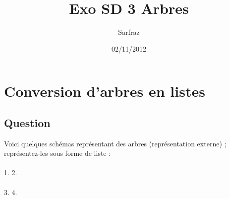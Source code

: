 \documentclass[a4paper, 11pt]{article}
\title{Exo SD 3 Arbres}
\author{Sarfraz \bsc{kapasi}}
\date{02/11/2012}
\begin{document}
%
\maketitle
%
\section{Conversion d'arbres en listes}
\subsection{Question}
Voici quelques schémas représentant des arbres (représentation externe) ; représentez-les sous forme de liste :\\\\
1.  2. \\\\
3.  4. \\\\
\end{document}
